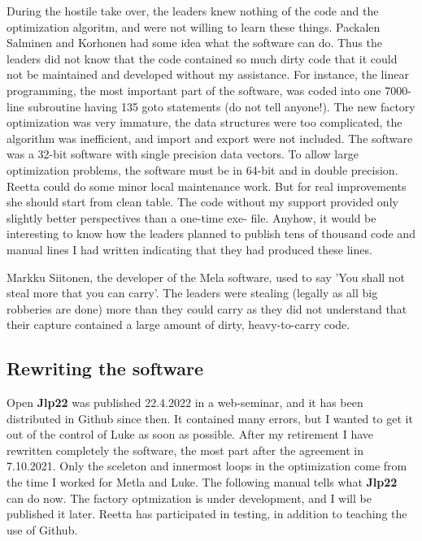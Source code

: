 During the hostile take over, the leaders knew nothing of the code
and the optimization algoritm,  and were not willing to learn these things. Packalen
Salminen and Korhonen had some idea what the software can do.
Thus the leaders did not know that
the code contained so much dirty code
that it could not be maintained and developed without my assistance.
For instance, the linear programming, the most important part of the software,
was coded into one 7000-line subroutine having 135 goto statements (do not tell anyone!).
The new factory optimization was very immature,
the data structures were too complicated, the algorithm was inefficient,
and import and export were not included.
The software was a 32-bit software with single precision data vectors. To allow
large optimization problems, the software must be
in 64-bit and in double precision.
Reetta could do some minor local maintenance work. But for
real improvements she should
start from clean table.
The code without my support
provided only slightly better perspectives than a one-time exe- file.
Anyhow, it would be interesting to know how the leaders planned to publish
tens of thousand code and manual lines I had written indicating that they
had produced these lines.

Markku Siitonen, the developer of the Mela software, used to say
'You shall not steal more that you can carry'. The leaders were
stealing (legally as all big robberies are done) more than they could carry
as they did not understand that their capture contained a large amount of dirty,
heavy-to-carry code.


\subsection*{Rewriting the software}

Open \textbf{Jlp22} was published 22.4.2022 in a web-seminar, and it has been distributed in Github since then.
It contained many errors, but I wanted to get it out of the control of Luke as soon as possible.
After my retirement I have rewritten completely the software,
the most part after the agreement in 7.10.2021.
Only the sceleton and innermost loops in the optimization come from the time I worked
for Metla and Luke. The following manual tells what \textbf{Jlp22} can do now.
The factory optmization is under development, and I will be published it later.
Reetta has participated
in testing, in addition to teaching the use of Github.

